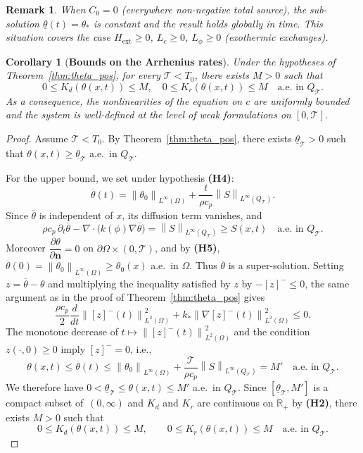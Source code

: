 \documentclass[final,1p,times]{elsarticle}
\numberwithin{equation}{section}
\newtheorem{corollary}[theorem]{Corollary}
\newtheorem{remark}[theorem]{Remark}
\newcommand{\QT}{Q_{\mathcal{T}}}
\newcommand{\norm}[1]{\left\|#1\right\|}
\newcommand{\pneg}[1]{\left[#1\right]^{-}}
\begin{document}
	\begin{remark}
		\label{rem:theta_global}
		When $C_0 = 0$ (everywhere non-negative total source), the sub-solution $\underline{\theta}(t) = \theta_*$
		is constant and the result holds globally in time. This situation covers the case
		$H_{\mathrm{ext}} \geq 0$, $L_c \geq 0$, $L_\phi \geq 0$ (exothermic exchanges).
	\end{remark}
	
	\begin{corollary}[\textbf{Bounds on the Arrhenius rates}]
		\label{cor:Arrhenius}
		Under the hypotheses of Theorem~\ref{thm:theta_pos}, for every $\mathcal{T} < T_0$, there
		exists $M > 0$ such that
		\[
		0 \leq K_d(\theta(x,t)) \leq M, \quad 0 \leq K_r(\theta(x,t)) \leq M
		\quad\text{a.e. in } \QT.
		\]
		As a consequence, the nonlinearities of the equation on $c$ are uniformly bounded and the system is well-defined at the level of weak formulations on $[0,\mathcal{T}]$.
	\end{corollary}
	
	\begin{proof}
		Assume $\mathcal{T} < T_0$. By Theorem~\ref{thm:theta_pos},
		there exists $\underline{\theta}_{\mathcal{T}} > 0$ such that
		$\theta(x,t) \geq \underline{\theta}_{\mathcal{T}}$ a.e.\ in
		$Q_{\mathcal{T}}$.
		
		For the upper bound, we set under hypothesis \textbf{(H4)}:
		\[
		\overline{\theta}(t)
		= \norm{\theta_0}_{L^\infty(\Omega)}
		+ \dfrac{t}{\rho c_p}\norm{S}_{L^\infty(Q_{\mathcal{T}})}.
		\]
		Since $\overline\theta$ is independent of $x$, its diffusion term
		vanishes, and
		\[
		\rho c_p\,\partial_t\overline\theta
		- \nabla\cdot\bigl(k(\phi)\nabla\overline\theta\bigr)
		= \norm{S}_{L^\infty(Q_{\mathcal{T}})}
		\geq S(x,t)
		\quad\text{a.e. in } Q_{\mathcal{T}}.
		\]
		Moreover $\dfrac{\partial\theta}{\partial\mathbf{n}} = 0$ on
		$\partial\Omega\times(0,\mathcal{T})$, and by \textbf{(H5)},
		$\overline\theta(0) = \norm{\theta_0}_{L^\infty(\Omega)} \geq \theta_0(x)$
		a.e.\ in $\Omega$. Thus $\overline\theta$ is a super-solution. Setting $z = \overline\theta - \theta$
		and multiplying the inequality satisfied by $z$ by $-\pneg{z} \leq 0$,
		the same argument as in the proof of Theorem~\ref{thm:theta_pos} gives
		\[
		\frac{\rho c_p}{2}\frac{d}{dt}\norm{\pneg{z}(t)}_{L^2(\Omega)}^2
		+ k_*\norm{\nabla\pneg{z}(t)}_{L^2(\Omega)}^2 \leq 0.
		\]
		The monotone decrease of $t\mapsto\norm{\pneg{z}(t)}_{L^2(\Omega)}^2$ and the condition
		$z(\cdot,0)\geq 0$ imply $\pneg{z} = 0$, i.e.,
		\[
		\theta(x,t) \leq \overline\theta(t)
		\leq \norm{\theta_0}_{L^\infty(\Omega)}
		+ \frac{\mathcal{T}}{\rho c_p}\norm{S}_{L^\infty(Q_{\mathcal{T}})}
		= M'
		\quad\text{a.e. in } Q_{\mathcal{T}}.
		\]
		We therefore have
		$0 < \underline{\theta}_{\mathcal{T}} \leq \theta(x,t) \leq M'$
		a.e.\ in $Q_{\mathcal{T}}$.
		Since $[\underline{\theta}_{\mathcal{T}}, M']$ is a compact subset of
		$\,(0,\infty)$ and $K_d$ and $K_r$ are continuous on $\mathbb{R}_+$
		by \textbf{(H2)}, there exists $M > 0$ such that
		\[
		0 \leq K_d(\theta(x,t)) \leq M,
		\qquad
		0 \leq K_r(\theta(x,t)) \leq M
		\quad\text{a.e. in } Q_{\mathcal{T}}.
		\]
	\end{proof}
	
\end{document}
